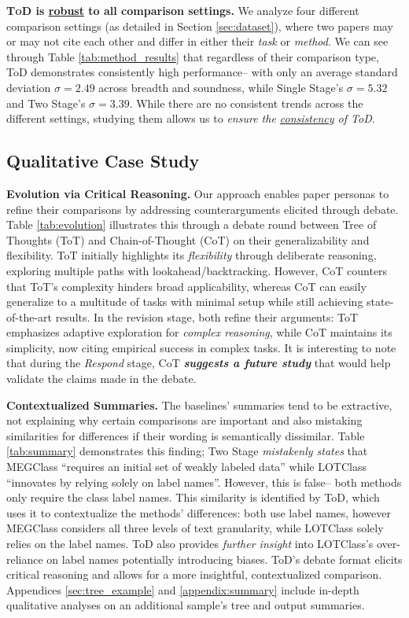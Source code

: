 \par{\textbf{\textsc{ToD} is \underline{robust} to all comparison settings.}} We analyze four different comparison settings (as detailed in Section \ref{sec:dataset}), where two papers may or may not cite each other and differ in either their \textit{task} or \textit{method}. We can see through Table \ref{tab:method_results} that regardless of their comparison type, ToD demonstrates consistently high performance-- with only an average standard deviation $\sigma=2.49$ across breadth and soundness, while Single Stage's $\sigma = 5.32$ and Two Stage's $\sigma=3.39$. While there are no consistent trends across the different settings, studying them allows us to \textit{ensure the \underline{consistency} of ToD}.




\subsection{Qualitative Case Study}
\label{sec:summary_case_study}
\par{\textbf{Evolution via Critical Reasoning.}} Our approach enables paper personas to refine their comparisons by addressing counterarguments elicited through debate. Table \ref{tab:evolution} illustrates this through a debate round between Tree of Thoughts (ToT) and Chain-of-Thought (CoT) on their generalizability and flexibility. ToT initially highlights its \textit{flexibility} through deliberate reasoning, exploring multiple paths with lookahead/backtracking. However, CoT counters that ToT's complexity hinders broad applicability, whereas CoT can easily generalize to a multitude of tasks with minimal setup while still achieving state-of-the-art results. In the revision stage, both refine their arguments: ToT emphasizes adaptive exploration for \textit{complex reasoning}, while CoT maintains its simplicity, now citing empirical success in complex tasks. It is interesting to note that during the \textit{Respond} stage, CoT \textbf{\textit{suggests a future study}} that would help validate the claims made in the debate.

\par{\textbf{Contextualized Summaries.}} The baselines' summaries tend to be extractive, not explaining why certain comparisons are important and also mistaking similarities for differences if their wording is semantically dissimilar. Table \ref{tab:summary} demonstrates this finding; Two Stage \textit{mistakenly states} that MEGClass ``requires an initial set of weakly labeled data'' while LOTClass ``innovates by relying solely on label names''. However, this is false-- both methods only require the class label names. This similarity is identified by ToD, which uses it to contextualize the methods' differences: both use label names, however MEGClass considers all three levels of text granularity, while LOTClass solely relies on the label names. ToD also provides \textit{further insight} into LOTClass's over-reliance on label names potentially introducing biases. ToD's debate format elicits critical reasoning and allows for a more insightful, contextualized comparison. Appendices \ref{sec:tree_example} and \ref{appendix:summary} include in-depth qualitative analyses on an additional sample's tree and output summaries.